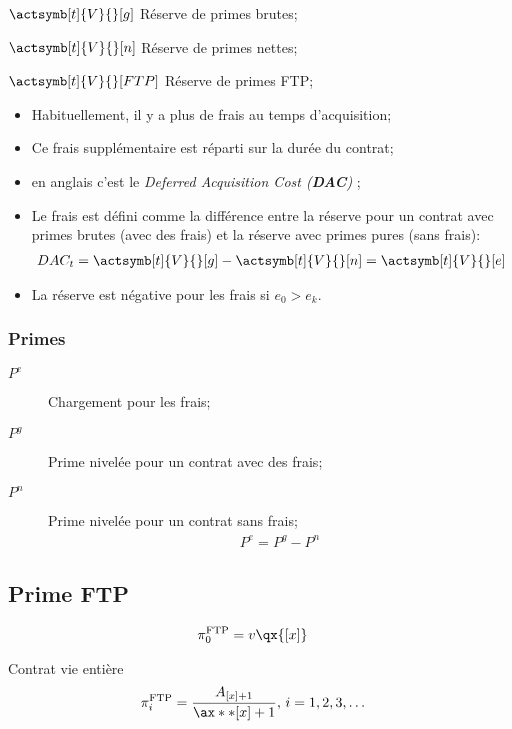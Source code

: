 \documentclass[10pt, french]{article}
\begin{document}
\begin{multicols*}{2}
\begin{description}
	\item	$\actsymb[t]{V}{}[g]$	Réserve de primes brutes;
	\item	$\actsymb[t]{V}{}[n]$	Réserve de primes nettes;
	\item	$\actsymb[t]{V}{}[FTP]$	Réserve de primes FTP;
\end{description}


\begin{itemize}[leftmargin = *]
	\item	Habituellement, il y a plus de frais au temps d'acquisition;
	\item	Ce frais supplémentaire est réparti sur la durée du contrat;
	\item	en anglais c'est le \og \textit{Deferred Acquisition Cost (\textbf{DAC})} \fg{};
	\item	Le frais est défini comme la différence entre la réserve pour un contrat avec primes brutes (avec des frais) et la réserve avec primes pures (sans frais):
		\begin{align*}
		DAC_{t}	
		=	\actsymb[t]{V}{}[g] - \actsymb[t]{V}{}[n] 
		= 	\actsymb[t]{V}{}[e]
		\end{align*}
	\item	La réserve est négative pour les frais si $e_{0} > e_{k}$.
\end{itemize}

\subsubsection*{Primes}
\begin{description}
	\item[$P^{e}$]	Chargement pour les frais;
	\item[$P^{g}$]	Prime nivelée pour un contrat avec des frais;
	\item[$P^{n}$]	Prime nivelée pour un contrat sans frais;
		\begin{align*}
		P^{e}	=	P^{g}	-	P^{n}
		\end{align*}
\end{description}


\subsection*{Prime FTP}
\begin{align*}
	\pi_{0}^{\text{FTP}}
	&=	v \qx{[x]}
\end{align*}

Contrat vie entière
\begin{align*}
	\pi^{\text{FTP}}	_{i}
	&=	\frac{A_{[x] + 1}}{\ax**{[x] + 1}}, 	\,	i = 1, 2, 3, \dots	
\end{align*}


\end{multicols*}
\end{document}
